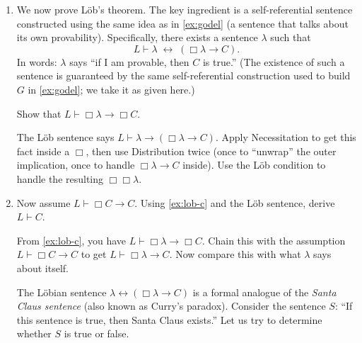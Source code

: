 \documentclass[11pt]{article}
\begin{document}
\begin{exercise}
\begin{enumerate}
\medskip
\noindent
Explain why Distribution is true from the perspective of $\texttt{ProofSeeker}$.

\begin{hint}

If both $\texttt{ProofSeeker}(\varphi \to \psi)$ and
$\texttt{ProofSeeker}(\varphi)$ halt, what can you do with their outputs? How can $L$ deduce that $\texttt{ProofSeeker}(\psi)$ halts?
\end{hint}

\item \label{ex:lob-c} We now prove L\"ob's theorem. The key ingredient is a self-referential sentence
constructed using the same idea as in \cref{ex:godel} (a sentence that talks about its
own provability). Specifically, there exists a sentence $\lambda$ such that
\[
  L \vdash \lambda \;\leftrightarrow\; (\Box\lambda \to C).
\]
In words: $\lambda$ says ``if I am provable, then $C$ is true.'' (The existence of
such a sentence is guaranteed by the same self-referential construction used to build
$G$ in \cref{ex:godel}; we take it as given here.)

Show that $L \vdash \Box\lambda \to \Box C$.

\begin{hint}

The L\"ob sentence says $L \vdash \lambda \to (\Box\lambda \to C)$.
Apply Necessitation to get this fact inside a $\Box$, then use Distribution twice
(once to ``unwrap'' the outer implication, once to handle $\Box\lambda \to C$
inside). Use the L\"ob condition to handle the resulting $\Box\Box\lambda$.
\end{hint}

\item \label{ex:lob-d} Now assume $L \vdash \Box C \to C$. Using \cref{ex:lob-c} and the
L\"ob sentence, derive $L \vdash C$.

\begin{hint}

From \cref{ex:lob-c}, you have $L \vdash \Box\lambda \to \Box C$. Chain this
with the assumption $L \vdash \Box C \to C$ to get
$L \vdash \Box\lambda \to C$. Now compare this with what $\lambda$ says about
itself.
\end{hint}

\begin{remark}
The L\"obian sentence $\lambda \leftrightarrow (\Box\lambda \to C)$ is a formal
analogue of the \emph{Santa Claus sentence} (also known as Curry's paradox). Consider
the sentence $S$: ``If this sentence is true, then Santa Claus exists.'' Let us try
to determine whether $S$ is true or false.


\end{remark}
\end{enumerate}
\end{exercise}
\end{document}
